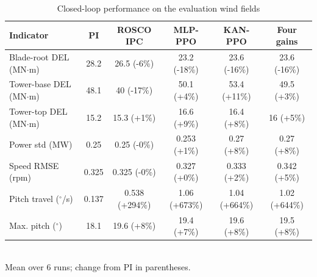 \begin{table}[!t]
\centering
\caption{Closed-loop performance on the evaluation wind fields}
\label{tab:performance}
\renewcommand{\arraystretch}{1.15}
\begin{tabular}{lccccc}
\hline\hline
Indicator & PI & ROSCO IPC & MLP-PPO & KAN-PPO & Four gains \\
\hline
Blade-root DEL (MN$\cdot$m) & 28.2 & 26.5 (-6\%) & 23.2 (-18\%) & 23.6 (-16\%) & 23.6 (-16\%) \\
Tower-base DEL (MN$\cdot$m) & 48.1 & 40 (-17\%) & 50.1 (+4\%) & 53.4 (+11\%) & 49.5 (+3\%) \\
Tower-top DEL (MN$\cdot$m) & 15.2 & 15.3 (+1\%) & 16.6 (+9\%) & 16.4 (+8\%) & 16 (+5\%) \\
Power std (MW) & 0.25 & 0.25 (-0\%) & 0.253 (+1\%) & 0.27 (+8\%) & 0.27 (+8\%) \\
Speed RMSE (rpm) & 0.325 & 0.325 (-0\%) & 0.327 (+0\%) & 0.333 (+2\%) & 0.342 (+5\%) \\
Pitch travel ($^\circ$/s) & 0.137 & 0.538 (+294\%) & 1.06 (+673\%) & 1.04 (+664\%) & 1.02 (+644\%) \\
Max. pitch ($^\circ$) & 18.1 & 19.6 (+8\%) & 19.4 (+7\%) & 19.6 (+8\%) & 19.5 (+8\%) \\
\hline\hline
\end{tabular}
\\[2pt]\footnotesize Mean over 6 runs; change from PI in parentheses.
\end{table}
